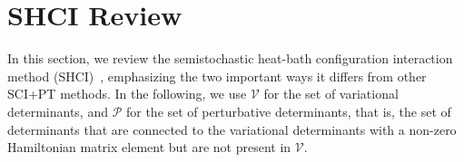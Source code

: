 \documentclass[%
preprint,
 superscriptaddress,
 amsmath,amssymb,
 aps,
]{revtex4-1}
\def\V{\mathcal{V}}
\def\P{\mathcal{P}}
\begin{document}


\section{SHCI Review}
\label{overview}
In this section, we review the semistochastic heat-bath configuration interaction method (SHCI)~\cite{HolTubUmr-JCTC-16,ShaHolJeaAlaUmr-JCTC-17,HolUmrSha-JCP-17},
emphasizing the two important ways it differs from other SCI+PT methods.
In the following, we use $\V$ for the set of variational determinants, and $\P$ for the set of perturbative determinants, that is, the set of determinants that are connected to the variational determinants with a non-zero Hamiltonian matrix element but are not present in $\V$.
\end{document}
